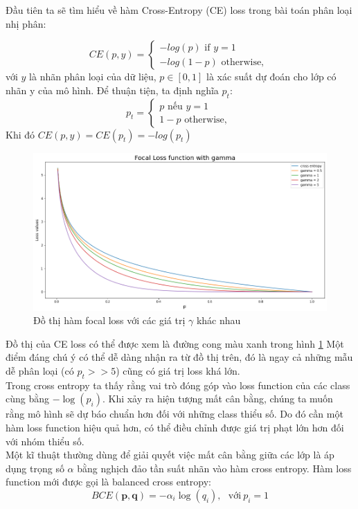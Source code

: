 \documentclass[a4paper, 12pt]{report}
\begin{document}
Đầu tiên ta sẽ tìm hiểu về hàm Cross-Entropy (CE) loss trong bài toán phân loại nhị phân:

\begin{equation}
CE(p,y) = 
\begin{cases} 
-log(p) \textrm{     if      }  y =1 \\
-log(1-p) \textrm{     otherwise,      }
\end{cases}
\end{equation}
với $y$ là nhãn phân loại của dữ liệu,  $p \in [0, 1]$ là xác suất dự đoán cho lớp có nhãn y của mô hình. Để thuận tiện, ta định nghĩa $p_t$:
\begin{equation}
p_t = 
\begin{cases} 
p \textrm{    nếu      }  y =1 \\
1-p \textrm{     otherwise,      }
\end{cases}
\end{equation}
Khi đó $CE(p,y)=CE(p_t)=-log(p_t)$ \\
\begin{figure}[!h]
	\centering
	\includegraphics[width=1\linewidth]{Images/FocalLoss_6_1}
	\caption{Đồ thị hàm focal loss với các giá trị $\gamma$ khác nhau}
	\label{fig:focal-loss_gamma}
\end{figure} 

Đồ thị của CE loss có thể được xem là đường cong màu xanh trong hình \ref{fig:focal-loss_gamma} Một điểm đáng chú ý có thể dễ dàng nhận ra từ đồ thị trên, đó là ngay cả những mẫu dễ phân loại  (có $p_{t} >> 5$) cũng có giá trị loss khá lớn.\\
Trong cross entropy ta thấy rằng vai trò đóng góp vào loss function của các class cùng bằng $-\log(p_i)$. Khi xảy ra hiện tượng mất cân bằng, chúng ta muốn rằng mô hình sẽ dự báo chuẩn hơn đối với những class thiểu số. Do đó cần một hàm loss function hiệu quả hơn, có thể điều chỉnh được giá trị phạt lớn hơn đối với nhóm thiểu số. \\
Một kĩ thuật thường dùng để giải quyết việc mất cân bằng giữa các lớp là áp dụng trọng số $\alpha$ bằng nghịch đảo tần suất nhãn vào hàm cross entropy. Hàm loss function mới được gọi là balanced cross entropy:
\begin{equation}
BCE(\mathbf{p}, \mathbf{q}) = -\alpha_i\log(q_i),~~~ \text{với} ~ p_i=1
\end{equation}
\end{document}
